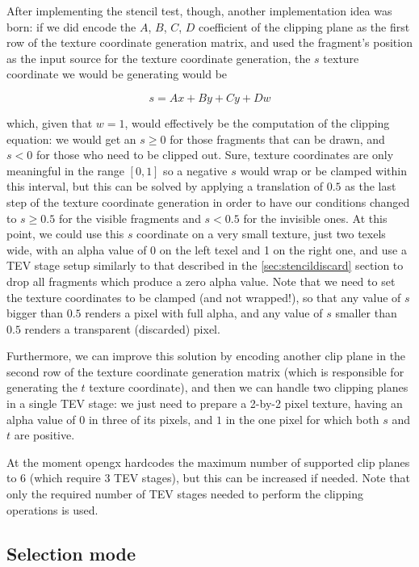 \documentclass[12pt]{article}
\begin{document}
After implementing the stencil test, though, another implementation idea was born: if we did encode the $A$, $B$, $C$, $D$ coefficient of the clipping plane as the first row of the texture coordinate generation matrix, and used the fragment's position as the input source for the texture coordinate generation, the $s$ texture coordinate we would be generating would be

$$s = Ax + By + Cy + Dw$$

which, given that $w = 1$, would effectively be the computation of the clipping equation: we would get an $s \geq 0$ for those fragments that can be drawn, and $s < 0$ for those who need to be clipped out. Sure, texture coordinates are only meaningful in the range $[0,1]$ so a negative $s$ would wrap or be clamped within this interval, but this can be solved by applying a translation of $0.5$ as the last step of the texture coordinate generation in order to have our conditions changed to $s \geq 0.5$ for the visible fragments and $s < 0.5$ for the invisible ones. At this point, we could use this $s$ coordinate on a very small texture, just two texels wide, with an alpha value of 0 on the left texel and 1 on the right one, and use a TEV stage setup similarly to that described in the \ref{sec:stencildiscard} section to drop all fragments which produce a zero alpha value. Note that we need to set the texture coordinates to be clamped (and not wrapped!), so that any value of $s$ bigger than $0.5$ renders a pixel with full alpha, and any value of $s$ smaller than $0.5$ renders a transparent (discarded) pixel.

Furthermore, we can improve this solution by encoding another clip plane in the second row of the texture coordinate generation matrix (which is responsible for generating the $t$ texture coordinate), and then we can handle two clipping planes in a single TEV stage: we just need to prepare a 2-by-2 pixel texture, having an alpha value of $0$ in three of its pixels, and $1$ in the one pixel for which both $s$ and $t$ are positive.

At the moment opengx hardcodes the maximum number of supported clip planes to 6 (which require 3 TEV stages), but this can be increased if needed. Note that only the required number of TEV stages needed to perform the clipping operations is used.


\subsection {Selection mode}
\end{document}
